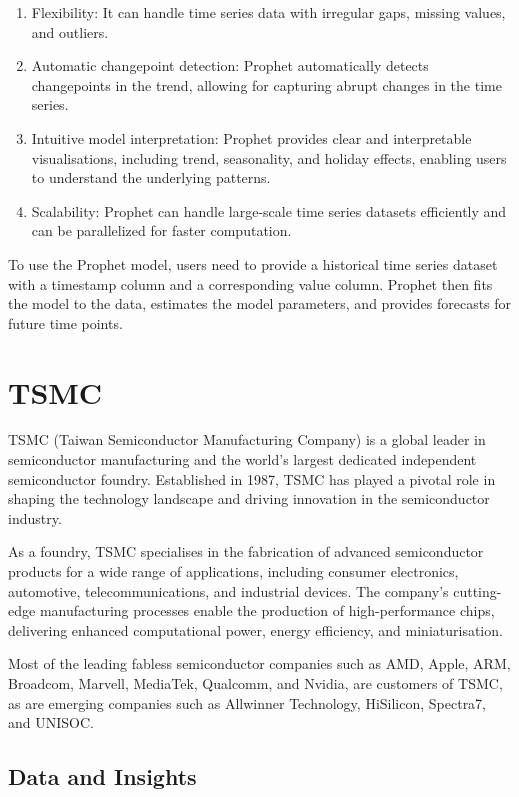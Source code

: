 \documentclass[
]{article}
\begin{document}
\begin{enumerate}
\def\labelenumi{\arabic{enumi}.}
\item
  Flexibility: It can handle time series data with irregular gaps,
  missing values, and outliers.
\item
  Automatic changepoint detection: Prophet automatically detects
  changepoints in the trend, allowing for capturing abrupt changes in
  the time series.
\item
  Intuitive model interpretation: Prophet provides clear and
  interpretable visualisations, including trend, seasonality, and
  holiday effects, enabling users to understand the underlying patterns.
\item
  Scalability: Prophet can handle large-scale time series datasets
  efficiently and can be parallelized for faster computation.
\end{enumerate}

To use the Prophet model, users need to provide a historical time series
dataset with a timestamp column and a corresponding value column.
Prophet then fits the model to the data, estimates the model parameters,
and provides forecasts for future time points.

\hypertarget{tsmc}{%
\section{TSMC}\label{tsmc}}

TSMC (Taiwan Semiconductor Manufacturing Company) is a global leader in
semiconductor manufacturing and the world's largest dedicated
independent semiconductor foundry. Established in 1987, TSMC has played
a pivotal role in shaping the technology landscape and driving
innovation in the semiconductor industry.

As a foundry, TSMC specialises in the fabrication of advanced
semiconductor products for a wide range of applications, including
consumer electronics, automotive, telecommunications, and industrial
devices. The company's cutting-edge manufacturing processes enable the
production of high-performance chips, delivering enhanced computational
power, energy efficiency, and miniaturisation.

Most of the leading fabless semiconductor companies such as AMD, Apple,
ARM, Broadcom, Marvell, MediaTek, Qualcomm, and Nvidia, are customers of
TSMC, as are emerging companies such as Allwinner Technology, HiSilicon,
Spectra7, and UNISOC.

\hypertarget{data-and-insights}{%
\subsection{Data and Insights}\label{data-and-insights}}
\end{document}

